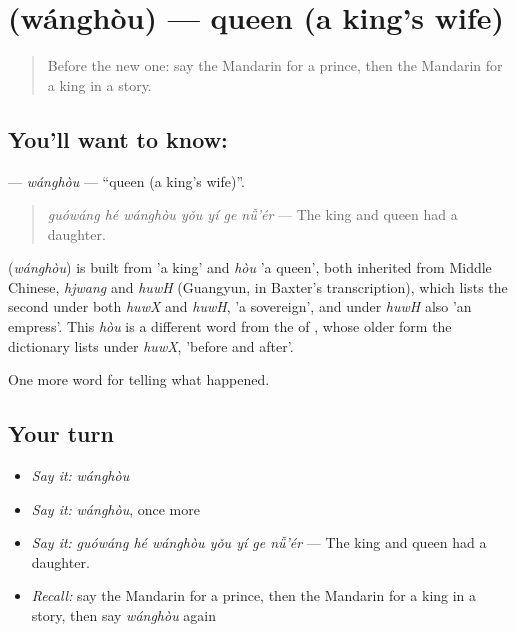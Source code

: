 \section[\texorpdfstring{\zh{王后} (wánghòu)}{王后 (wánghòu)}]{ (wánghòu) — queen (a king's wife)}

\label{lesson:ZH-C330-wanghou}



\begin{quote}
Before the new one: say the Mandarin for a prince, then the Mandarin for a king in a story.
\end{quote}

\subsection*{You'll want to know: }
\textbf{} — \emph{wánghòu} — \textquotedblleft{}queen (a king's wife)\textquotedblright{}.

\begin{quote}
\textbf{} \emph{guówáng hé wánghòu yǒu yí ge nǚ'ér} — The king and queen had a daughter.
\end{quote}

\begin{cousinweb}
\textbf{} (\emph{wánghòu}) is built from  'a king' and \emph{hòu} 'a queen', both inherited from Middle Chinese, \emph{hjwang} and \emph{huwH} (Guangyun, in Baxter's transcription), which lists the second under both \emph{huwX} and \emph{huwH}, 'a sovereign', and under \emph{huwH} also 'an empress'. This \emph{hòu} is a different word from the  of , whose older form the dictionary lists under \emph{huwX}, 'before and after'.
\end{cousinweb}

\begin{grammarlens}[title={What you've built}]
One more word for telling what happened.
\end{grammarlens}

\subsection*{Your turn}
\begin{itemize}
\raggedright
  \item \emph{Say it:} \emph{wánghòu}
  \item \emph{Say it:} \emph{wánghòu}, once more
  \item \emph{Say it:} \emph{guówáng hé wánghòu yǒu yí ge nǚ'ér} — The king and queen had a daughter.
  \item \emph{Recall:} say the Mandarin for a prince, then the Mandarin for a king in a story, then say \emph{wánghòu} again
\end{itemize}


